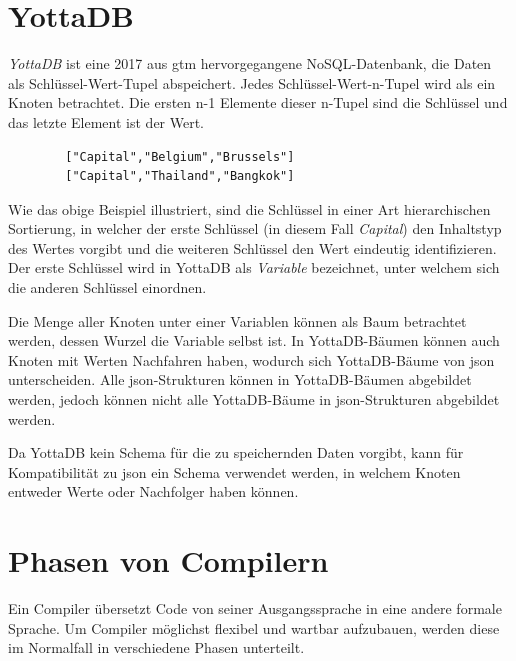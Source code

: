 \documentclass[oneside]{ausarbeitung}
\begin{document}
	
	
	
	\section{YottaDB}
	
	\textit{YottaDB} ist eine 2017 aus \ac{gtm} hervorgegangene NoSQL-Datenbank, die Daten als Schlüssel-Wert-Tupel abspeichert. Jedes Schlüssel-Wert-n-Tupel wird als ein Knoten betrachtet. Die ersten n-1 Elemente dieser n-Tupel sind die Schlüssel und das letzte Element ist der Wert. 
	
	\begin{lstlisting}
		["Capital","Belgium","Brussels"]
		["Capital","Thailand","Bangkok"]
	\end{lstlisting}
	
	Wie das obige Beispiel illustriert, sind die Schlüssel in einer Art hierarchischen Sortierung, in welcher der erste Schlüssel (in diesem Fall \textit{Capital}) den Inhaltstyp des Wertes vorgibt und die weiteren Schlüssel den Wert eindeutig identifizieren. Der erste Schlüssel wird in YottaDB als \textit{Variable} bezeichnet, unter welchem sich die anderen Schlüssel einordnen.
	
	Die Menge aller Knoten unter einer Variablen können als Baum betrachtet werden, dessen Wurzel die Variable selbst ist. In YottaDB-Bäumen können auch Knoten mit Werten Nachfahren haben, wodurch sich YottaDB-Bäume von \ac{json} unterscheiden. Alle \ac{json}-Strukturen können in YottaDB-Bäumen abgebildet werden, jedoch können nicht alle YottaDB-Bäume in \ac{json}-Strukturen abgebildet werden.
	
	Da YottaDB kein Schema für die zu speichernden Daten vorgibt, kann für Kompatibilität zu \ac{json} ein Schema verwendet werden, in welchem Knoten entweder Werte oder Nachfolger haben können.
	
	
	
	
	\section{Phasen von Compilern}

	Ein Compiler übersetzt Code von seiner Ausgangssprache in eine andere formale Sprache. Um Compiler möglichst flexibel und wartbar aufzubauen, werden diese im Normalfall in verschiedene Phasen unterteilt.
	
\end{document}
